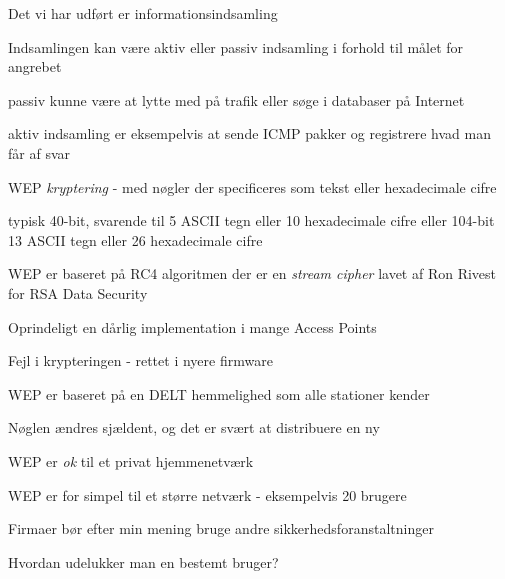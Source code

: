 \documentclass[Screen16to9,17pt]{foils}
\begin{document}



\begin{list1}
\item Det vi har udført er informationsindsamling
\item Indsamlingen kan være aktiv eller passiv indsamling i forhold
  til målet for angrebet
\item passiv kunne være at lytte med på trafik eller søge i databaser
  på Internet
\item aktiv indsamling er eksempelvis at sende ICMP pakker og
  registrere hvad man får af svar
\end{list1}


\begin{list1}
\item WEP \emph{kryptering} - med nøgler der specificeres som tekst
  eller hexadecimale cifre
\item typisk 40-bit, svarende til 5 ASCII tegn eller 10 hexadecimale
  cifre eller 104-bit 13 ASCII tegn eller 26 hexadecimale cifre
\item WEP er baseret på RC4 algoritmen der er en \emph{stream cipher}
  lavet af Ron Rivest for RSA Data Security
\end{list1}


\begin{list1}
\item Oprindeligt en dårlig implementation i mange Access Points
\item Fejl i krypteringen - rettet i nyere firmware
\item WEP er baseret på en DELT hemmelighed som alle stationer kender
\item Nøglen ændres sjældent, og det er svært at distribuere en ny
\end{list1}


\begin{list1}
\item WEP er \emph{ok} til et privat hjemmenetværk
\item WEP er for simpel til et større netværk - eksempelvis 20 brugere
\item Firmaer bør efter min mening bruge andre
  sikkerhedsforanstaltninger
\item Hvordan udelukker man en bestemt bruger?
\end{list1}
\end{document}
